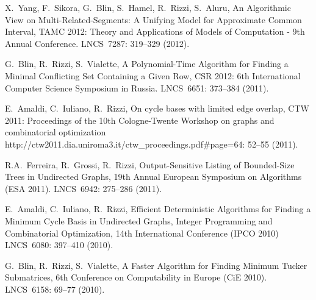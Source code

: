 \begin{etaremune}
\vspace{-1.8mm}
  \item {X.~Yang, F.~Sikora, G.~Blin, S.~Hamel, R.~Rizzi, S.~Aluru},
   \newblock An Algorithmic View on Multi-Related-Segments: A Unifying Model for Approximate Common Interval,
   \newblock TAMC 2012: Theory and Applications of Models of Computation - 9th Annual Conference.
   \newblock LNCS~7287: 319--329 (2012).

\vspace{-1.8mm}
  \item {G.~Blin, R.~Rizzi, S.~Vialette},
   \newblock A Polynomial-Time Algorithm for Finding a Minimal Conflicting Set Containing a Given Row,
   \newblock CSR 2012: 6th International Computer Science Symposium in Russia.
   \newblock LNCS~6651: 373--384 (2011).

\vspace{-1.8mm}
  \item {E.~Amaldi, C.~Iuliano, R.~Rizzi},
   \newblock On cycle bases with limited edge overlap,
   \newblock CTW 2011: Proceedings of the 10th Cologne-Twente Workshop on graphs and combinatorial optimization
   \newblock http://ctw2011.dia.uniroma3.it/ctw\_proceedings.pdf\#page=64: 52--55 (2011).

\vspace{-1.8mm}
  \item {R.A.~Ferreira, R.~Grossi, R.~Rizzi},
   \newblock Output-Sensitive Listing of Bounded-Size Trees in Undirected Graphs,
   \newblock 19th Annual European Symposium on Algorithms (ESA 2011).
   \newblock LNCS~6942: 275--286 (2011).

\vspace{-1.8mm}
  \item {E.~Amaldi, C.~Iuliano, R.~Rizzi},
   \newblock Efficient Deterministic Algorithms for Finding a Minimum Cycle Basis in Undirected Graphs,
   \newblock Integer Programming and Combinatorial Optimization, 14th International Conference (IPCO 2010)
   \newblock LNCS~6080: 397--410 (2010).
%

\vspace{-1.8mm}
  \item {G.~Blin, R.~Rizzi, S.~Vialette},
   \newblock A Faster Algorithm for Finding Minimum Tucker Submatrices,
   \newblock 6th Conference on Computability in Europe (CiE 2010).
   \newblock LNCS~6158: 69--77 (2010).


\end{etaremune}
